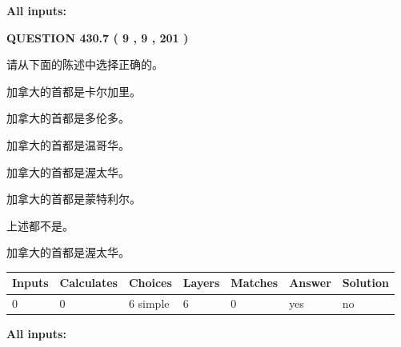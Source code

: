 \documentclass{ctexart}
\begin{document}
   
   
   
\noindent\vspace{0.1in}\hspace{-0.08in} {\textbf{\Large{All inputs: }}}
   
   
  
\vspace{0.2in}
  
{\textbf{\Large{QUESTION
430.7 
 ( 9 , 9 , 201 )
}}}
  
  
请从下面的陈述中选择正确的。
 
 
加拿大的首都是卡尔加里。
 
 
加拿大的首都是多伦多。
 
 
加拿大的首都是温哥华。
 
 
加拿大的首都是渥太华。
 
 
加拿大的首都是蒙特利尔。
 
 
 上述都不是。
 
 
\noindent{}
 
 
加拿大的首都是渥太华。
 
 
\noindent{}
 
 
   
   
   
   
\noindent\begin{tabular}{|l|l|l|l|l|l|l|}
 \hline
Inputs & Calculates & Choices & Layers & Matches & Answer & Solution \\ \hline
 0  & 
 0  & 
 6
  simple  
  & 
 6  & 
 0  & 
  yes & 
  no 
  \\ \hline
 \end{tabular}
   
   
   
   
\noindent{}
   
   
   
   
\noindent\vspace{0.1in}\hspace{-0.08in} {\textbf{\Large{All inputs: }}}
   
   
  
\vspace{0.2in}
  
\end{document}
